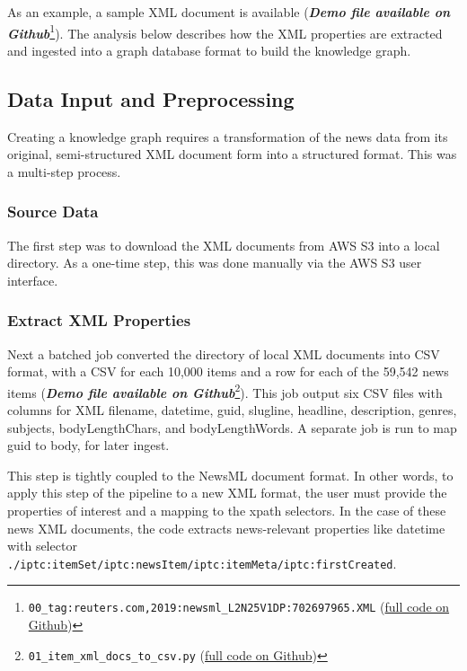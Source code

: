 \documentclass[11pt]{article}
\begin{document}
  As an example, a sample XML document is available (\textit{\textbf{Demo file available on Github}}\footnote{\lstinline{00_tag:reuters.com,2019:newsml_L2N25V1DP:702697965.XML} (\href{https://github.com/Birkbeck/msc-data-science-project-2020_21---files-heychrisek/}{full code on Github})}). The analysis below describes how the XML properties are extracted and ingested into a graph database format to build the knowledge graph.

  \subsection{Data Input and Preprocessing}
  Creating a knowledge graph requires a transformation of the news data from its original, semi-structured XML document form into a structured format. This was a multi-step process.

    \subsubsection{Source Data}
    The first step was to download the XML documents from AWS S3 into a local directory. As a one-time step, this was done manually via the AWS S3 user interface.

    \subsubsection{Extract XML Properties}

    Next a batched job converted the directory of local XML documents into CSV format, with a CSV for each 10,000 items and a row for each of the 59,542 news items (\textit{\textbf{Demo file available on Github}}\footnote{\lstinline{01_item_xml_docs_to_csv.py} (\href{https://github.com/Birkbeck/msc-data-science-project-2020_21---files-heychrisek/}{full code on Github})}). This job output six CSV files with columns for XML filename, datetime, guid, slugline, headline, description, genres, subjects, bodyLengthChars, and bodyLengthWords. A separate job is run to map guid to body, for later ingest.

    This step is tightly coupled to the NewsML document format. In other words, to apply this step of the pipeline to a new XML format, the user must provide the properties of interest and a mapping to the xpath selectors. In the case of these news XML documents, the code extracts news-relevant properties like datetime with selector \lstinline{./iptc:itemSet/iptc:newsItem/iptc:itemMeta/iptc:firstCreated}.
\end{document}
